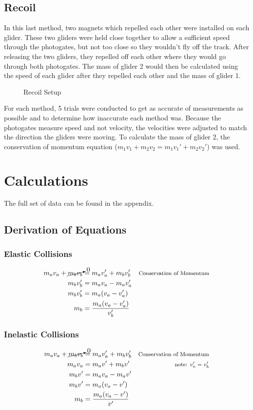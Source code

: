 \documentclass[12pt]{article}
\begin{document}
\subsection{Recoil}
In this last method, two magnets which repelled each other were installed on each glider. These two gliders were held close together to allow a sufficient speed through the photogates, but not too close so they wouldn't fly off the track. After releasing the two gliders, they repelled off each other where they would go through both photogates. The mass of glider 2 would then be calculated using the speed of each glider after they repelled each other and the mass of glider 1.
\begin{figure}[H]
    \centering
    \caption{Recoil Setup}
\end{figure}
For each method, 5 trials were conducted to get as accurate of measurements as possible and to determine how inaccurate each method was. Because the photogates measure speed and not velocity, the velocities were adjusted to match the direction the gliders were moving. To calculate the mass of glider 2, the conservation of momentum equation ($m_1v_1+m_2v_2=m_1v_1'+m_2v_2'$) was used.

\newpage
\section{Calculations}
The full set of data can be found in the appendix.
\subsection{Derivation of Equations}
\subsubsection{Elastic Collisions}
\begin{equation}
    \begin{aligned} m_av_a+\cancelto{0}{m_bv_b}&=m_av_a'+m_bv_b' & \text{\footnotesize{Conservation of Momentum}}\\
        m_bv_b'&=m_av_a-m_av_a' \\
        m_bv_b'&=m_a(v_a-v_a') \\
        m_b&=\frac{m_a(v_a-v_a')}{v_b'}
    \end{aligned}
\end{equation}
\subsubsection{Inelastic Collisions}
\begin{equation}
    \begin{aligned}
        m_av_a+\cancelto{0}{m_bv_b}&=m_av_a'+m_bv_b' & \text{\footnotesize{Conservation of Momentum}} \\
        m_av_a&=m_av'+m_bv' & \text{\footnotesize note: $v_a'=v_b'$} \\
        m_bv'&=m_av_a-m_av' \\
        m_bv'&=m_a(v_a-v') \\
        m_b&=\frac{m_a(v_a-v')}{v'}
    \end{aligned}
\end{equation}
\end{document}
